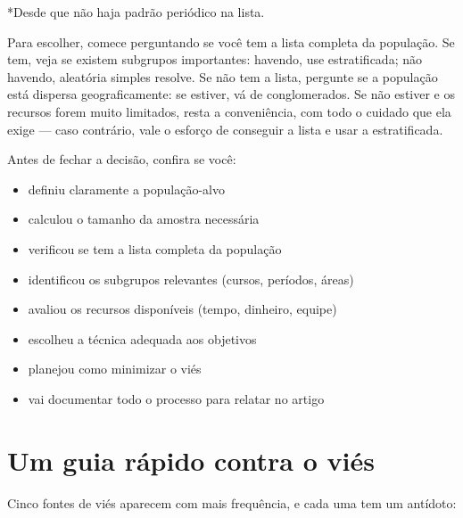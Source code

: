 \documentclass[
]{book}
\providecommand{\tightlist}{%
  \setlength{\itemsep}{0pt}\setlength{\parskip}{0pt}}
\begin{document}
*Desde que não haja padrão periódico na lista.

Para escolher, comece perguntando se você tem a lista completa da população. Se tem, veja se existem subgrupos importantes: havendo, use estratificada; não havendo, aleatória simples resolve. Se não tem a lista, pergunte se a população está dispersa geograficamente: se estiver, vá de conglomerados. Se não estiver e os recursos forem muito limitados, resta a conveniência, com todo o cuidado que ela exige --- caso contrário, vale o esforço de conseguir a lista e usar a estratificada.

Antes de fechar a decisão, confira se você:

\begin{itemize}
\tightlist
\item[$\square$]
  definiu claramente a população-alvo
\item[$\square$]
  calculou o tamanho da amostra necessária
\item[$\square$]
  verificou se tem a lista completa da população
\item[$\square$]
  identificou os subgrupos relevantes (cursos, períodos, áreas)
\item[$\square$]
  avaliou os recursos disponíveis (tempo, dinheiro, equipe)
\item[$\square$]
  escolheu a técnica adequada aos objetivos
\item[$\square$]
  planejou como minimizar o viés
\item[$\square$]
  vai documentar todo o processo para relatar no artigo
\end{itemize}

\section{Um guia rápido contra o viés}\label{um-guia-ruxe1pido-contra-o-viuxe9s}

Cinco fontes de viés aparecem com mais frequência, e cada uma tem um antídoto:
\end{document}
